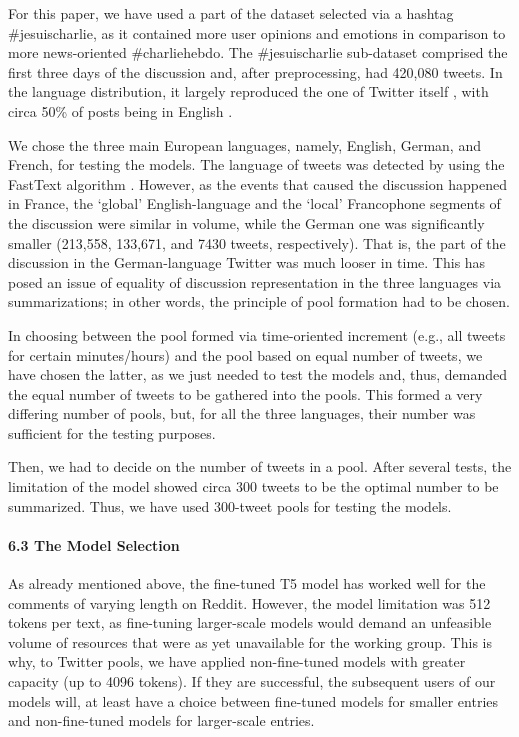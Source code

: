 For this paper, we have used a part of the dataset selected via a hashtag \#jesuischarlie, as it contained more user opinions and emotions in comparison to more news-oriented \#charliehebdo. The \#jesuischarlie sub-dataset comprised the first three days of the discussion and, after preprocessing, had 420,080 tweets. In the language distribution, it largely reproduced the one of Twitter itself \cite{HongAhmedGurumurthy}, with circa 50\% of posts being in English \cite{BodrunovaSmoliarovaBlekanov}.

We chose the three main European languages, namely, English, German, and French, for testing the models. The language of tweets was detected by using the FastText algorithm \cite{JoulinGraveBojanowski}. However, as the events that caused the discussion happened in France, the ‘global’ English-language and the ‘local’ Francophone segments of the discussion were similar in volume, while the German one was significantly smaller (213,558, 133,671, and 7430 tweets, respectively). That is, the part of the discussion in the German-language Twitter was much looser in time. This has posed an issue of equality of discussion representation in the three languages via summarizations; in other words, the principle of pool formation had to be chosen.

In choosing between the pool formed via time-oriented increment (e.g., all tweets for certain minutes/hours) and the pool based on equal number of tweets, we have chosen the latter, as we just needed to test the models and, thus, demanded the equal number of tweets to be gathered into the pools. This formed a very differing number of pools, but, for all the three languages, their number was sufficient for the testing purposes.

Then, we had to decide on the number of tweets in a pool. After several tests, the limitation of the model showed circa 300 tweets to be the optimal number to be summarized. Thus, we have used 300-tweet pools for testing the models.

\paragraph{6.3 The Model Selection}
As already mentioned above, the fine-tuned T5 model has worked well for the comments of varying length on Reddit. However, the model limitation was 512 tokens per text, as fine-tuning larger-scale models would demand an unfeasible volume of resources that were as yet unavailable for the working group. This is why, to Twitter pools, we have applied non-fine-tuned models with greater capacity (up to 4096 tokens). If they are successful, the subsequent users of our models will, at least have a choice between fine-tuned models for smaller entries and non-fine-tuned models for larger-scale entries.

